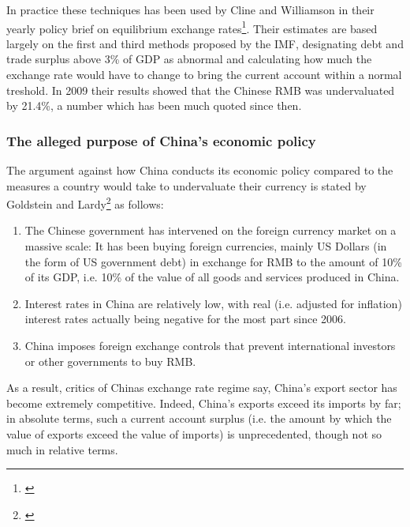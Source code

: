 \documentclass[11pt]{article}
\begin{document}
In practice these techniques has been used by Cline and Williamson in 
their yearly policy brief on equilibrium exchange 
rates\footnote{\cite{cline2009,cline2012}}.  Their estimates are based 
largely on the first and third methods proposed by the IMF, designating 
debt and trade surplus above 3\% of GDP as abnormal and calculating how 
much the exchange rate would have to change to bring the current account 
within a normal treshold. In 2009 their results showed that the Chinese 
RMB was undervaluated by 21.4\%, a number which has been much quoted 
since then.

\subsubsection{The alleged purpose of China's economic policy}

The argument against how China conducts its economic policy compared to 
the measures a country would take to undervaluate their currency is 
stated by Goldstein and Lardy\footnote{\cite[pp.  
40]{GoldsteinLardy2008}} as follows:

\begin{enumerate}
\item{The Chinese government has intervened on the foreign currency 
		market on a massive scale: It has been buying foreign 
		currencies, mainly US Dollars (in the form of US government 
		debt) in exchange for RMB to the amount of 10\% of its GDP, i.e. 
		10\% of the value of all goods and services produced in China.} 
\item{Interest rates in China are relatively low, with real (i.e. adjusted for inflation) interest rates actually being negative for the most part since 2006.} %
\item{China imposes foreign exchange controls that prevent international investors or other governments to buy RMB.}%
\end{enumerate}

As a result, critics of Chinas exchange rate regime say, China's export sector has become extremely competitive. Indeed, China's exports exceed its imports by far; in absolute terms, such a current account surplus (i.e. the amount by which the value of exports exceed the value of imports) is unprecedented, though not so much in relative terms. %
\end{document}

